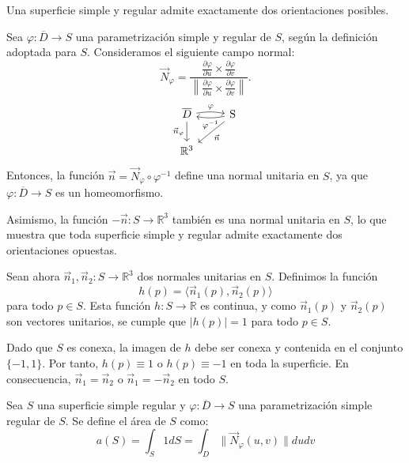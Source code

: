 \begin{observación}
Una superficie simple y regular admite exactamente dos orientaciones posibles.

Sea \( \varphi : \overline{D} \to S \) una parametrización simple y regular de
\( S \), según la definición adoptada para \( S \). Consideramos el siguiente
campo normal:
\[
    \vec{N}_{\varphi} = \frac{\frac{\partial \varphi}{\partial u} \times \frac{\partial \varphi}{\partial v}}{\left\| \frac{\partial \varphi}{\partial u} \times \frac{\partial \varphi}{\partial v} \right\|}.
\]
\[
    \begin{tikzcd}
        {\overline{D}} \arrow[d, "\vec{n}_\varphi" left]
        \arrow[r, bend left=10, "\varphi"]
        & \operatorname{S}
        \arrow[dl, "\vec{n}"]
        \arrow[l, bend left=10, "\varphi^{-1}"] \\
        {\mathbb{R}^3}
    \end{tikzcd}
\]
Entonces, la función \( \vec{n} = \vec{N}_{\varphi} \circ \varphi^{-1} \)
define una normal unitaria en \( S \), ya que \( \varphi : \overline{D} \to S
\) es un homeomorfismo.

Asimismo, la función \( -\vec{n} : S \to \mathbb{R}^3 \) también es una normal
unitaria en \( S \), lo que muestra que toda superficie simple y regular admite
exactamente dos orientaciones opuestas.

Sean ahora \( \vec{n}_1, \vec{n}_2 : S \to \mathbb{R}^3 \) dos normales
unitarias en \( S \). Definimos la función
\[
    h(p) = \langle \vec{n}_1(p), \vec{n}_2(p) \rangle
\]
para todo \( p \in S \). Esta función \( h : S \to \mathbb{R} \) es continua, y
como \( \vec{n}_1(p) \) y \( \vec{n}_2(p) \) son vectores unitarios, se cumple
que \( |h(p)| = 1 \) para todo \( p \in S \).

Dado que \( S \) es conexa, la imagen de \( h \) debe ser conexa y contenida en
el conjunto \( \{-1, 1\} \). Por tanto, \( h(p) \equiv 1 \) o \( h(p) \equiv -1
\) en toda la superficie. En consecuencia, \( \vec{n}_1 = \vec{n}_2 \) o \(
\vec{n}_1 = -\vec{n}_2 \) en todo \( S \).
\end{observación}

\begin{definición} 
Sea \( S \) una superficie simple regular y $\varphi : \overline{D} \to S$ una parametrización simple regular de \( S \). Se define el área de \( S \) como:
$$ a(S) = \int_{S} 1 dS = \int_{D} \lVert \vec{N}_\varphi(u,v) \rVert dudv
$$ 
\end{definición}

